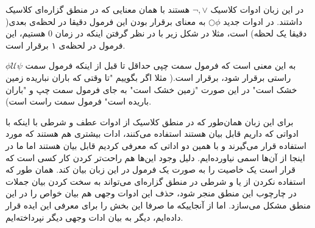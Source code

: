 در این زبان ادوات کلاسیک 
$\neg, \lor$
هستند با همان معنایی که در منطق گزاره‌ای کلاسیک داشتند.  
در ادوات جدید 
$\bigcirc \phi$
به معنای برقرار بودن این فرمول دقیقا در لحظه‌ی بعدی( دقیقا یک لحظه) است، مثلا در شکل زیر با در نظر گرفتن اینکه در زمان 0 هستیم، این فرمول در لحظه‌ی ۱ برقرار است.
	\begin{center}
\end{center}
$\phi \mathcal{U}\psi$
به این معنی است که فرمول سمت چپی حداقل تا قبل از اینکه فرمول سمت راستی برقرار شود، برقرار است.( مثلا اگر بگوییم "تا وقتی که باران نباریده زمین خشک است" در این صورت "زمین خشک است" به جای فرمول سمت چپ و "باران باریده است" فرمول سمت راست است).
\begin{center}
\end{center}

برای این زبان همان‌طور که در منطق کلاسیک از ادوات عطف و شرطی با اینکه با ادواتی که داریم قابل بیان هستند استفاده می‌کنند، ادات بیشتری هم هستند که مورد استفاده قرار می‌گیرند و با همین دو اداتی که معرفی کردیم قابل بیان هستند اما ما در اینجا از آن‌ها اسمی نیاورده‌ایم. دلیل وجود این‌ها هم راحت‌تر کردن کار کسی است که قرار است یک خاصیت را به صورت یک فرمول در این زبان بیان کند. همان طور که استفاده نکردن از یا و شرطی در منطق گزاره‌ای می‌تواند به سخت کردن بیان جملات در چارچوب این منطق منجر شود، حذف این ادوات وجهی هم بیان خواص را در این منطق مشکل می‌سازد. اما از آنجاییکه ما صرفا این بخش را برای معرفی این ایده قرار داده‌ایم، دیگر به بیان ادات وجهی دیگر نپرداخته‌ایم.

